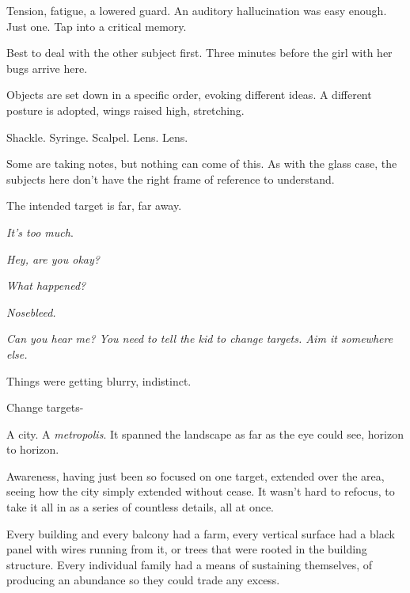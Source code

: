 Tension, fatigue, a lowered guard.  An auditory hallucination was easy enough.  Just one.  Tap into a critical memory.



Best to deal with the other subject first.  Three minutes before the girl with her bugs arrive here.



Objects are set down in a specific order, evoking different ideas.  A different posture is adopted, wings raised high, stretching.



Shackle.  Syringe.  Scalpel.  Lens.  Lens.



Some are taking notes, but nothing can come of this.  As with the glass case, the subjects here don't have the right frame of reference to understand.



The intended target is far, far away.



\emph{It's too much}.



\emph{Hey, are you okay?}



\emph{What happened?}



\emph{Nosebleed.}



\emph{Can you hear me?  You need to tell the kid to change targets.  Aim it somewhere else.}



Things were getting blurry, indistinct.



Change targets-



\blacksquare



A city.  A \emph{metropolis}.  It spanned the landscape as far as the eye could see, horizon to horizon.



Awareness, having just been so focused on one target, extended over the area, seeing how the city simply extended without cease.  It wasn't hard to refocus, to take it all in as a series of countless details, all at once.



Every building and every balcony had a farm, every vertical surface had a black panel with wires running from it, or trees that were rooted in the building structure.  Every individual family had a means of sustaining themselves, of producing an abundance so they could trade any excess.




